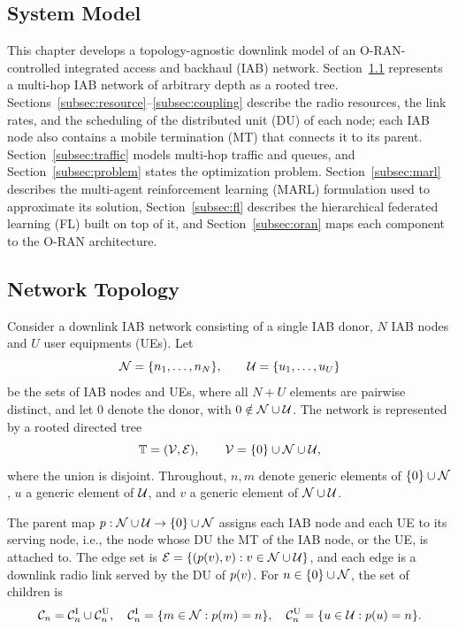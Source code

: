 \begin{EnChapter}

\chapter{System Model}
\label{chap:system-model}

This chapter develops a topology-agnostic downlink model of an O-RAN-controlled
integrated access and backhaul (IAB) network. Section~\ref{subsec:topology}
represents a multi-hop IAB network of arbitrary depth as a rooted tree.
Sections~\ref{subsec:resource}--\ref{subsec:coupling} describe the radio resources,
the link rates, and the scheduling of the distributed unit (DU) of each node; each
IAB node also contains a mobile termination (MT) that connects it to its parent. Section~\ref{subsec:traffic} models multi-hop
traffic and queues, and Section~\ref{subsec:problem} states the optimization
problem. Section~\ref{subsec:marl} describes the multi-agent reinforcement learning
(MARL) formulation used to approximate its solution, Section~\ref{subsec:fl}
describes the hierarchical federated learning (FL) built on top of it, and
Section~\ref{subsec:oran} maps each component to the O-RAN architecture.

\section{Network Topology}
\label{subsec:topology}

Consider a downlink IAB network consisting of a single IAB donor, $N$ IAB nodes
and $U$ user equipments (UEs). Let
\begin{equation}
  \mathcal{N} = \{n_1, \dots, n_N\}, \qquad \mathcal{U} = \{u_1, \dots, u_U\}
\end{equation}
be the sets of IAB nodes and UEs, where all $N+U$ elements are pairwise distinct,
and let $0$ denote the donor, with $0 \notin \mathcal{N} \cup \mathcal{U}$. The network is
represented by a rooted directed tree
\begin{equation}
  \mathbb{T} = (\mathcal{V}, \mathcal{E}), \qquad \mathcal{V} = \{0\} \cup \mathcal{N} \cup \mathcal{U},
\end{equation}
where the union is disjoint. Throughout, $n,m$ denote generic elements of
$\{0\} \cup \mathcal{N}$, $u$ a generic element of $\mathcal{U}$, and $v$ a generic element of
$\mathcal{N} \cup \mathcal{U}$.

\begin{definition}
\label{def:parent}
The parent map $p : \mathcal{N} \cup \mathcal{U} \rightarrow \{0\} \cup \mathcal{N}$ assigns
each IAB node and each UE to its serving node, i.e., the node whose DU the MT of the
IAB node, or the UE, is attached to. The edge set is
$\mathcal{E} = \{(p(v), v) : v \in \mathcal{N} \cup \mathcal{U}\}$, and each edge is a downlink
radio link served by the DU of $p(v)$. For $n \in \{0\} \cup \mathcal{N}$, the set of
children is
\begin{equation}
  \mathcal{C}_n = \mathcal{C}_n^{\mathrm{I}} \cup \mathcal{C}_n^{\mathrm{U}}, \quad
  \mathcal{C}_n^{\mathrm{I}} = \{m \in \mathcal{N} : p(m) = n\}, \quad
  \mathcal{C}_n^{\mathrm{U}} = \{u \in \mathcal{U} : p(u) = n\}.
\end{equation}
\end{definition}


\end{EnChapter}
